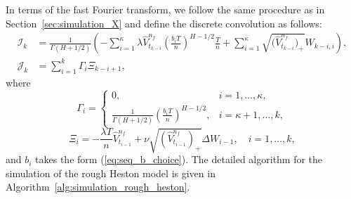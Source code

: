 \documentclass[11pt]{article}%
\theoremstyle{definition}
\begin{document}
In terms of the fast Fourier transform, we follow the same procedure as in Section~\ref{sec:simulation_X} and define the discrete convolution as follows:
\begin{align}
    \mathcal{I}_k &= \frac{1}{\Gamma(H+1/2)} \left(-\sum_{i=1}^{\kappa} \lambda \widehat{V}_{t_{k-i}}^{n_f} \left(\frac{b_i T}{n}\right)^{H-1/2} \frac{T}{n} + \sum_{i=1}^{\kappa} \sqrt{\bigl(\widehat{V}_{t_{k-i}}^{n_f}\bigr)_+} W_{k-i,i}\right),\label{eq:I_k_rough_heston}\\
    \mathcal{J}_k &= \sum_{i=1}^{k} \varGamma_i \varXi_{k-i+1},\label{eq:fft_J_rough_heston}
\end{align}
where \[
\varGamma_i = \begin{cases}
0, & i=1,\ldots,\kappa,\\
\frac{1}{\Gamma(H+1/2)}\left(\frac{b_{i}T}{n}\right)^{H-1/2}, & i=\kappa+1,\ldots,k,
\end{cases}
\]
\[
\varXi_i = -\frac{\lambda T}{n}\widehat{V}_{t_{i-1}}^{n_f} + \nu \sqrt{(\widehat{V}_{t_{i-1}}^{n_f})_+} \Delta W_{i-1},\quad i=1,\ldots,k,
\]
and \(b_i\) takes the form (\ref{eq:seq_b_choice}). The detailed algorithm for the simulation of the rough Heston model is given in Algorithm~\ref{alg:simulation_rough_heston}.
\end{document}
